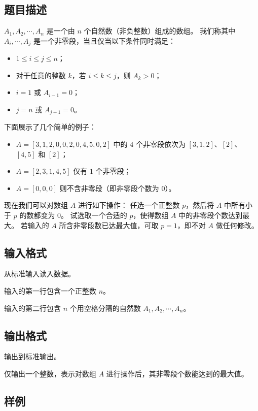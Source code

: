 \subsection*{题目描述}

$A_1, A_2, \cdots, A_n$ 是一个由 $n$ 个自然数（非负整数）组成的数组。
我们称其中 $A_i, \cdots, A_j$ 是一个非零段，当且仅当以下条件同时满足：

\begin{itemize}
    \item $1 \le i \le j \le n$；
    \item 对于任意的整数 $k$，若 $i \le k \le j$，则 $A_k > 0$；
    \item $i = 1$ 或 $A_{i-1} = 0$；
    \item $j = n$ 或 $A_{j+1} = 0$。
\end{itemize}

下面展示了几个简单的例子：

\begin{itemize}
    \item $A = [3, 1, 2, 0, 0, 2, 0, 4, 5, 0, 2]$ 中的 $4$ 个非零段依次为 $[3, 1, 2]$、$[2]$、$[4, 5]$ 和 $[2]$；
    \item $A = [2, 3, 1, 4, 5]$ 仅有 $1$ 个非零段；
    \item $A = [0, 0, 0]$ 则不含非零段（即非零段个数为 $0$）。
\end{itemize}

现在我们可以对数组 $A$ 进行如下操作：
任选一个正整数 $p$，然后将 $A$ 中所有小于 $p$ 的数都变为 $0$。
试选取一个合适的 $p$，使得数组 $A$ 中的非零段个数达到最大。
若输入的 $A$ 所含非零段数已达最大值，可取 $p=1$，即不对 $A$ 做任何修改。

\subsection*{输入格式}

从标准输入读入数据。

输入的第一行包含一个正整数 $n$。

输入的第二行包含 $n$ 个用空格分隔的自然数 $A_1, A_2, \cdots, A_n$。

\subsection*{输出格式}

输出到标准输出。

仅输出一个整数，表示对数组 $A$ 进行操作后，其非零段个数能达到的最大值。

\subsection*{样例}


